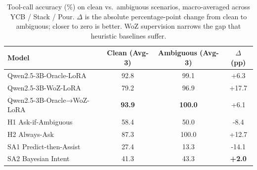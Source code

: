 \begin{table}[t]
\centering
\small
\setlength{\tabcolsep}{4pt}
\caption{Tool-call accuracy (\%) on clean vs.\ ambiguous scenarios, macro-averaged across YCB / Stack / Pour. $\Delta$ is the absolute percentage-point change from clean to ambiguous; closer to zero is better. WoZ supervision narrows the gap that heuristic baselines suffer.}
\label{tab:ambiguous_vs_clean}
\begin{tabular}{lccc}
\toprule
Model & Clean (Avg-3) & Ambiguous (Avg-3) & $\Delta$ (pp) \\
\midrule
Qwen2.5-3B-Oracle-LoRA & 92.8 & 99.1 & +6.3 \\
Qwen2.5-3B-WoZ-LoRA & 79.2 & 96.9 & +17.7 \\
Qwen2.5-3B-Oracle→WoZ-LoRA & \textbf{93.9} & \textbf{100.0} & +6.1 \\
\midrule
H1 Ask-if-Ambiguous & 58.4 & 50.0 & -8.4 \\
H2 Always-Ask & 87.3 & 100.0 & +12.7 \\
SA1 Predict-then-Assist & 27.4 & 13.3 & -14.1 \\
SA2 Bayesian Intent & 41.3 & 43.3 & \textbf{+2.0} \\
\bottomrule
\end{tabular}
\end{table}
